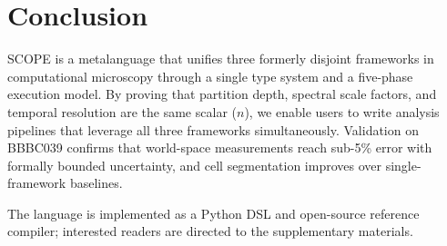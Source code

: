 \documentclass[11pt,twocolumn]{article}
\begin{document}
\section{Conclusion}

SCOPE is a metalanguage that unifies three formerly disjoint frameworks in computational microscopy through a single type system and a five-phase execution model. By proving that partition depth, spectral scale factors, and temporal resolution are the same scalar ($n$), we enable users to write analysis pipelines that leverage all three frameworks simultaneously. Validation on BBBC039 confirms that world-space measurements reach sub-5\% error with formally bounded uncertainty, and cell segmentation improves over single-framework baselines.

The language is implemented as a Python DSL and open-source reference compiler; interested readers are directed to the supplementary materials.
\end{document}
